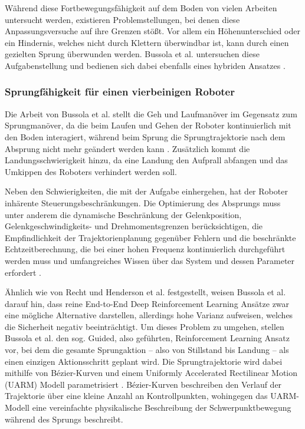 Während diese Fortbewegungsfähigkeit auf dem Boden von vielen Arbeiten untersucht werden, existieren Problemstellungen, bei denen diese Anpassungsversuche auf ihre Grenzen stößt. Vor allem ein Höhenunterschied oder ein Hindernis, welches nicht durch Klettern überwindbar ist, kann durch einen gezielten Sprung überwunden werden. Bussola et al. untersuchen diese Aufgabenstellung und bedienen sich dabei ebenfalls eines hybriden Ansatzes \cite{bussolaGuidedReinforcementLearning2025}.
 
\subsubsection{Sprungfähigkeit für einen vierbeinigen Roboter}
Die Arbeit von Bussola et al. stellt die Geh und Laufmanöver im Gegensatz zum Sprungmanöver, da die beim Laufen und Gehen der Roboter kontinuierlich mit den Boden interagiert, während beim Sprung die Sprungtrajektorie nach dem Absprung nicht mehr geändert werden kann \cite{bussolaGuidedReinforcementLearning2025}.
Zusätzlich kommt die Landungsschwierigkeit hinzu, da eine Landung den Aufprall abfangen und das Umkippen des Roboters verhindert werden soll.

Neben den Schwierigkeiten, die mit der Aufgabe einhergehen, hat der Roboter inhärente Steuerungsbeschränkungen. Die Optimierung des Absprungs muss unter anderem die dynamische Beschränkung der Gelenkposition, Gelenkgeschwindigkeits- und Drehmomentsgrenzen berücksichtigen, die Empfindlichkeit der Trajektorienplanung gegenüber Fehlern und die beschränkte Echtzeitberechnung, die bei einer hohen Frequenz kontinuierlich durchgeführt werden muss und umfangreiches Wissen über das System und dessen Parameter erfordert \cite{bussolaGuidedReinforcementLearning2025}.

Ähnlich wie von Recht \cite{rechtTourReinforcementLearning2018} und Henderson et al. \cite{hendersonDeepReinforcementLearning2019} festgestellt, weisen Bussola et al. darauf hin, dass reine End-to-End Deep Reinforcement Learning Ansätze zwar eine mögliche Alternative darstellen, allerdings hohe Varianz aufweisen, welches die Sicherheit negativ beeinträchtigt.\newline
Um dieses Problem zu umgehen, stellen Bussola et al. den sog. Guided, also geführten, Reinforcement Learning Ansatz vor, bei dem die gesamte Sprungaktion – also von Stillstand bis Landung – als einen einzigen Aktionsschritt geplant wird. Die Sprungtrajektorie wird dabei mithilfe von Bézier-Kurven und einem Uniformly Accelerated Rectilinear Motion (UARM) Modell parametrisiert \cite{bussolaGuidedReinforcementLearning2025}. \newline
Bézier-Kurven beschreiben den Verlauf der Trajektorie über eine kleine Anzahl an Kontrollpunkten, wohingegen das UARM-Modell eine vereinfachte physikalische Beschreibung der Schwerpunktbewegung während des Sprungs beschreibt.

